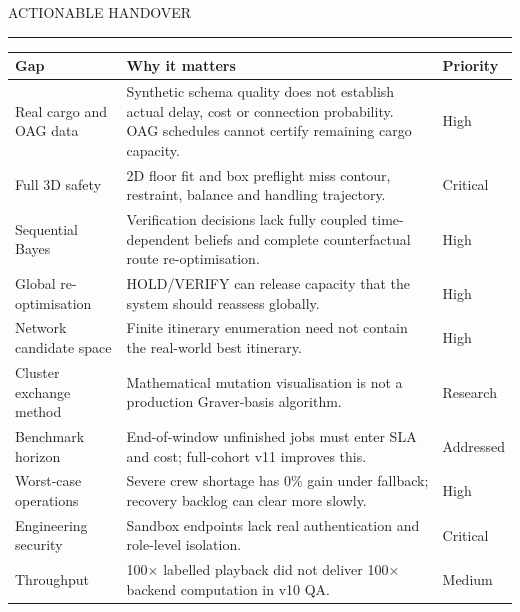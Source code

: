 \documentclass[10pt,a4paper]{article}
\newcommand{\sect}[2]{\vspace{4mm}{\Large\sffamily\bfseries #1}\hfill{\small\sffamily\color{muted}#2}\par\vspace{1mm}\color{sage}\rule{\linewidth}{1.0pt}\color{ink}\vspace{2mm}}
\newcommand{\subsect}[1]{\vspace{3mm}{\large\sffamily\bfseries #1}\par\vspace{1mm}}
\begin{document}
\sect{13 / QA findings and production gaps}{ACTIONABLE HANDOVER}
\begin{tabularx}{\linewidth}{@{}p{33mm}X>{\centering\arraybackslash}p{19mm}@{}}
\toprule
Gap & Why it matters & Priority\\\midrule
Real cargo and OAG data & Synthetic schema quality does not establish actual delay, cost or connection probability. OAG schedules cannot certify remaining cargo capacity. & High\\
Full 3D safety & 2D floor fit and box preflight miss contour, restraint, balance and handling trajectory. & Critical\\
Sequential Bayes & Verification decisions lack fully coupled time-dependent beliefs and complete counterfactual route re-optimisation. & High\\
Global re-optimisation & HOLD/VERIFY can release capacity that the system should reassess globally. & High\\
Network candidate space & Finite itinerary enumeration need not contain the real-world best itinerary. & High\\
Cluster exchange method & Mathematical mutation visualisation is not a production Graver-basis algorithm. & Research\\
Benchmark horizon & End-of-window unfinished jobs must enter SLA and cost; full-cohort v11 improves this. & Addressed\\
Worst-case operations & Severe crew shortage has 0\% gain under fallback; recovery backlog can clear more slowly. & High\\
Engineering security & Sandbox endpoints lack real authentication and role-level isolation. & Critical\\
Throughput & 100$\times$ labelled playback did not deliver 100$\times$ backend computation in v10 QA. & Medium\\
\bottomrule
\end{tabularx}
\subsect{A narrow, credible shadow-mode pilot}
\par\vspace{2mm}
\end{document}
